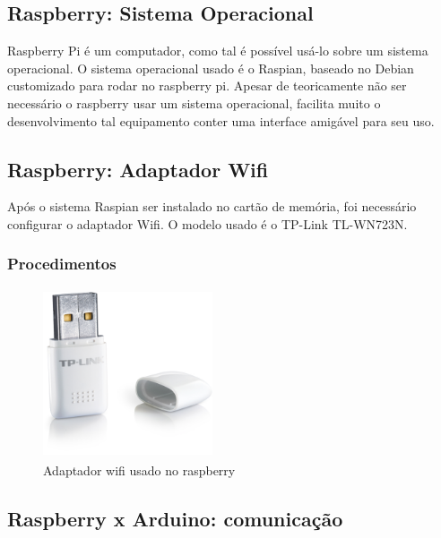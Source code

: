 \subsection{Raspberry: Sistema Operacional}

Raspberry Pi é um computador, como tal é possível usá-lo sobre um sistema operacional. O sistema operacional usado é o Raspian, baseado no Debian customizado para rodar no raspberry pi. Apesar de teoricamente não ser necessário o raspberry usar um sistema operacional, facilita muito o desenvolvimento tal equipamento conter uma interface amigável para seu uso.

\subsection{Raspberry: Adaptador Wifi}

Após o sistema Raspian ser instalado no cartão de memória, foi necessário configurar o adaptador Wifi. O modelo usado é o TP-Link TL-WN723N.

\subsubsection{Procedimentos}

\begin{figure}[H]
\centering
\includegraphics[width=5cm,height=5cm,keepaspectratio]{figuras/wifi-adapter.jpg}
\caption{\label{fig:wifi-adapter} Adaptador wifi usado no raspberry}
\end{figure}

\subsection{Raspberry x Arduino: comunicação}

